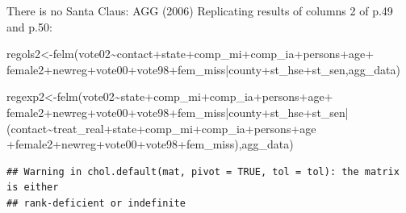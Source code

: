 \documentclass[
  ignorenonframetext,
]{beamer}
\newenvironment{Shaded}{\begin{snugshade}}{\end{snugshade}}
\newcommand{\FunctionTok}[1]{\textcolor[rgb]{0.00,0.00,0.00}{#1}}
\newcommand{\NormalTok}[1]{#1}
\newcommand{\OtherTok}[1]{\textcolor[rgb]{0.56,0.35,0.01}{#1}}
\newcommand{\SpecialCharTok}[1]{\textcolor[rgb]{0.00,0.00,0.00}{#1}}
\begin{document}
\begin{frame}[fragile]{There is no Santa Claus: AGG (2006)}
\protect\hypertarget{there-is-no-santa-claus-agg-2006-5}{}
Replicating results of columns 2 of p.49 and p.50: \tiny 

\begin{Shaded}
\begin{Highlighting}[]
\NormalTok{regols2}\OtherTok{\textless{}{-}}\FunctionTok{felm}\NormalTok{(vote02}\SpecialCharTok{\textasciitilde{}}\NormalTok{contact}\SpecialCharTok{+}\NormalTok{state}\SpecialCharTok{+}\NormalTok{comp\_mi}\SpecialCharTok{+}\NormalTok{comp\_ia}\SpecialCharTok{+}\NormalTok{persons}\SpecialCharTok{+}\NormalTok{age}\SpecialCharTok{+}
\NormalTok{                female2}\SpecialCharTok{+}\NormalTok{newreg}\SpecialCharTok{+}\NormalTok{vote00}\SpecialCharTok{+}\NormalTok{vote98}\SpecialCharTok{+}\NormalTok{fem\_miss}\SpecialCharTok{|}\NormalTok{county}\SpecialCharTok{+}\NormalTok{st\_hse}\SpecialCharTok{+}\NormalTok{st\_sen,agg\_data)}

\NormalTok{regexp2}\OtherTok{\textless{}{-}}\FunctionTok{felm}\NormalTok{(vote02}\SpecialCharTok{\textasciitilde{}}\NormalTok{state}\SpecialCharTok{+}\NormalTok{comp\_mi}\SpecialCharTok{+}\NormalTok{comp\_ia}\SpecialCharTok{+}\NormalTok{persons}\SpecialCharTok{+}\NormalTok{age}\SpecialCharTok{+}
\NormalTok{                female2}\SpecialCharTok{+}\NormalTok{newreg}\SpecialCharTok{+}\NormalTok{vote00}\SpecialCharTok{+}\NormalTok{vote98}\SpecialCharTok{+}\NormalTok{fem\_miss}\SpecialCharTok{|}\NormalTok{county}\SpecialCharTok{+}\NormalTok{st\_hse}\SpecialCharTok{+}\NormalTok{st\_sen}\SpecialCharTok{|}
\NormalTok{(contact}\SpecialCharTok{\textasciitilde{}}\NormalTok{treat\_real}\SpecialCharTok{+}\NormalTok{state}\SpecialCharTok{+}\NormalTok{comp\_mi}\SpecialCharTok{+}\NormalTok{comp\_ia}\SpecialCharTok{+}\NormalTok{persons}\SpecialCharTok{+}\NormalTok{age}
 \SpecialCharTok{+}\NormalTok{female2}\SpecialCharTok{+}\NormalTok{newreg}\SpecialCharTok{+}\NormalTok{vote00}\SpecialCharTok{+}\NormalTok{vote98}\SpecialCharTok{+}\NormalTok{fem\_miss),agg\_data)}
\end{Highlighting}
\end{Shaded}

\begin{verbatim}
## Warning in chol.default(mat, pivot = TRUE, tol = tol): the matrix is either
## rank-deficient or indefinite
\end{verbatim}
\end{frame}
\end{document}
